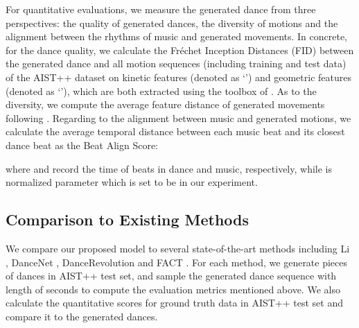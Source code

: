 For quantitative evaluations, we measure the generated dance from three perspectives: the quality of generated dances, the diversity of motions and the alignment between the rhythms of music and generated movements.
In concrete, for the dance quality, we calculate the Fréchet Inception Distances (FID) \cite{heusel2017gans} between the generated dance and all motion sequences (including training and test data) of the AIST++ dataset on kinetic features \cite{onuma2008fmdistance} (denoted as `') and geometric features \cite{muller2005efficient} (denoted as `'), which are both extracted using the toolbox of \cite{gopinath2020fairmotion}.
As to the diversity, we compute the average feature distance of generated movements following \cite{Li2021LearnTD}.
Regarding to the alignment between music and generated motions, we calculate the average temporal distance between each music
beat and its closest dance beat as the Beat Align Score:

where  and  record the time of beats in dance and music, respectively, while  is normalized parameter which is set to be  in our experiment.

\vspace{-3pt}
\subsection{Comparison to Existing Methods}
\vspace{-3pt}

We compare our proposed model
to several state-of-the-art methods including Li \etal \cite{Li2020LearningTG}, DanceNet \cite{Zhuang2020Music2DanceMD}, DanceRevolution \cite{Huang2021DanceRL} and FACT \cite{Li2021LearnTD}.
For each method, we generate  pieces of dances in AIST++ test set,
and sample the generated dance sequence with length of  seconds to compute the evaluation metrics mentioned above.
We also calculate the quantitative scores for ground truth data in AIST++ test set and compare it to the generated dances.


